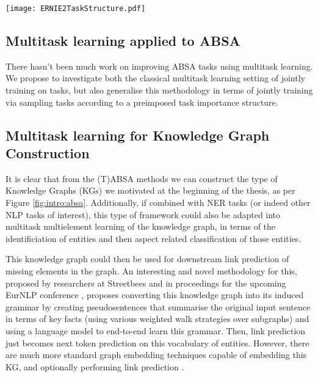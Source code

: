 {{\begin{center}
	\texttt{[image: ERNIE2TaskStructure.pdf]}
	\label{fig:background:ernietaskstructure}
\end{center}

\subsection{Multitask learning applied to ABSA}
There hasn't been much work on improving ABSA tasks using multitask learning. We propose to investigate both the classical multitask learning setting of jointly training on tasks, but also generalise this methodology in terms of jointly training via sampling tasks according to a preimposed task importance structure.

\subsection{Multitask learning for Knowledge Graph Construction}
It is clear that from the (T)ABSA methods we can construct the type of Knowledge Graphs (KGs) we motivated at the beginning of the thesis, as per Figure \ref{fig:intro:absa}. Additionally, if combined with NER tasks (or indeed other NLP tasks of interest), this type of framework could also be adapted into multitask multielement learning of the knowledge graph, in terms of the identificiation of entities and then aspect related classification of those entities. 

This knowledge graph could then be used for downstream link prediction of missing elements in the graph. An interesting and novel methodology for this, proposed by researchers at Streetbees and in proceedings for the upcoming EurNLP conference \cite{Garland2019}, proposes converting this knowledge graph into its induced grammar by creating pseudosentences that summarise the original input sentence in terms of key facts (using various weighted walk strategies over subgraphs) and using a language model to end-to-end learn this grammar. Then, link prediction just becomes next token prediction on this vocabulary of entities. However, there are much more standard graph embedding techniques capable of embedding this KG, and optionally performing link prediction \cite{Cai2017}.

}}
